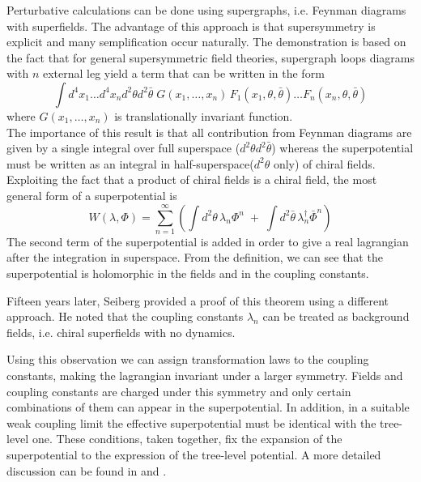 Perturbative calculations can be done using supergraphs, i.e. Feynman diagrams with superfields. 
The advantage of this approach is that supersymmetry is explicit and many semplification occur naturally. 
The demonstration is based on the fact that for general supersymmetric field theories, supergraph loops diagrams with $n$ external leg yield a term that can be written in the form
\begin{equation}
\int  d^4 x_1 \dots d^4 x_n d^2 \theta d^2 \bar{\theta} \; G (x_1 , \dots , x_n) \,F_1 ( x_1, \theta, \bar{\theta}) \dots  F_n ( x_n, \theta, \bar{\theta}) 
\end{equation} 
where $G (x_1 , \dots , x_n) $ is translationally invariant function.\\
The importance of this result is that all contribution from Feynman diagrams are given by a single integral over full superspace ($d^2 \theta d^2 \bar{\theta} $) whereas the superpotential must be written as an integral in half-superspace($d^2 \theta $ only) of chiral fields.
Exploiting the fact that a product of chiral fields is a chiral field, the most general form of a superpotential is 
\begin{equation}
 W (\lambda, \Phi) = \sum_{n=1}^{\infty} \left( \int d^2 \theta \, \lambda_n \Phi^n  \; +\;  \int d^2 \bar{\theta} \, \lambda_n^{\dagger} \bar{\Phi}^n \right)
 \end{equation} 
 The second term of the superpotential is added in order to give a real lagrangian after the integration in superspace.
From the definition, we can see that the superpotential is holomorphic in the fields and in the coupling constants.

Fifteen years later, Seiberg \cite{Seiberg:1993vc} provided a proof of this theorem using a different approach.
He noted that the coupling constants $\lambda_n$ can be treated as background fields, i.e. chiral superfields with no dynamics.

Using this observation we can assign transformation laws to the coupling constants, making the lagrangian invariant under a larger symmetry.
Fields and coupling constants are charged under this symmetry and only certain combinations of them can appear in the superpotential.
In addition, in a suitable weak coupling limit the effective superpotential must be identical with the tree-level one.
These conditions, taken together, fix the expansion of the superpotential to the expression of the tree-level potential.
A more detailed discussion can be found in \cite{Seiberg:1994bp} and \cite{Intriligator:1995au}.





